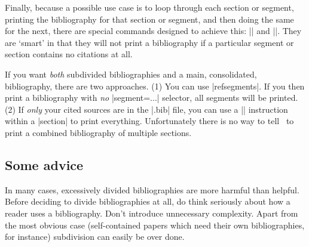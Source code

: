 Finally, because a possible use case is to loop through each
section or segment, printing the bibliography for that section or
segment, and then doing the same for the next, there are special
commands designed to achieve this: |\bibbysection| and
|\bibbysegment|. They are `smart' in that they will not print a
bibliography if a particular segment or section contains no citations
at all.

If you want \emph{both} subdivided bibliographies and a main,
consolidated, bibliography, there are two approaches. (1) You can use
|refsegments|. If you then print a bibliography with \emph{no}
|segment=...| selector, all segments will be printed. (2) If
\emph{only} your cited sources are in the |.bib| file, you can use a
|\nocite{*}| instruction within a |section| to print
everything. Unfortunately there is no way to tell \biblatex\ to print
a combined bibliography of multiple sections.

\subsection{Some advice}

In many cases, excessively divided bibliographies are more harmful
than helpful. Before deciding to divide bibliographies at all, do
think seriously about how a reader uses a bibliography. Don't
introduce unnecessary complexity. Apart from the most obvious case
(self-contained papers which need their own bibliographies, for
instance) subdivision can easily be over done.

